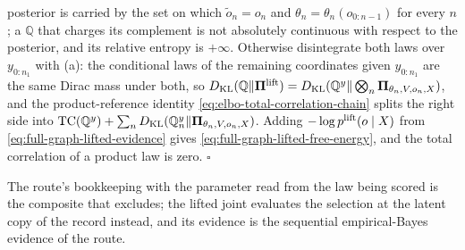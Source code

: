 posterior is carried by the set on which $\widetilde o_n=o_n$ and
$\theta_n=\theta_n(o_{0:n-1})$ for every $n$; a $\mathbb Q$ that charges its
complement is not absolutely continuous with respect to the posterior, and its
relative entropy is $+\infty$. Otherwise disintegrate both laws over $y_{0:n_1}$ with
(a): the conditional laws of the remaining coordinates
given $y_{0:n_1}$ are the same Dirac mass under both, so
$D_{\mathrm{KL}}(\mathbb Q\Vert\boldsymbol\Pi^{\mathrm{lift}})
=D_{\mathrm{KL}}(\mathbb Q^{y}\Vert\bigotimes_n\boldsymbol\Pi_{\theta_n,V,o_n,X})$, and the
product-reference identity \eqref{eq:elbo-total-correlation-chain} splits the right
side into $\operatorname{TC}(\mathbb Q^{y})+\sum_nD_{\mathrm{KL}}(\mathbb Q^{y}_n\Vert\boldsymbol\Pi_{\theta_n,V,o_n,X})$.
Adding $-\log p^{\mathrm{lift}}(o\mid X)$ from \eqref{eq:full-graph-lifted-evidence}
gives \eqref{eq:full-graph-lifted-free-energy}, and the total correlation of a product
law is zero. $\square$

The route's bookkeeping with the parameter read from the law being scored is the
composite that  excludes; the lifted joint evaluates
the selection at the latent copy of the record instead, and its evidence is the
sequential empirical-Bayes evidence of the route.

